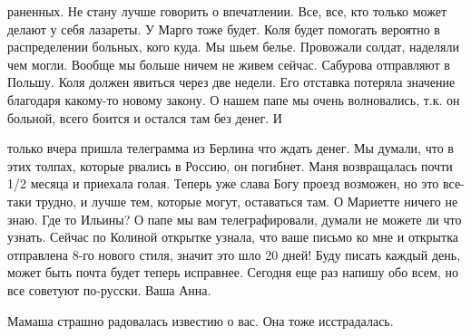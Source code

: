 
\noindent
раненных. Не стану лучше говорить о впечатлении. Все, все, кто только может
делают у себя лазареты. У Марго тоже будет. Коля будет помогать вероятно в
распределении больных, кого куда. Мы шьем белье. Провожали солдат, наделяли чем
могли. Вообще мы больше ничем не живем сейчас. Сабурова отправляют в Польшу.
Коля должен явиться через две недели. Его отставка потеряла значение благодаря
какому-то новому закону. О нашем папе мы очень волновались, т.к. он больной,
всего боится и остался там без денег. И


\noindent
только вчера пришла телеграмма из Берлина что ждать денег. Мы думали, что в
этих толпах, которые рвались в Россию, он погибнет. Маня возвращалась почти 1/2
месяца и приехала голая. Теперь уже слава Богу проезд возможен, но это все-таки
трудно, и лучше тем, которые могут, оставаться там. О Мариетте ничего не знаю.
Где то Ильины? О папе мы вам телеграфировали, думали не можете ли что узнать.
Сейчас по Колиной открытке узнала, что ваше письмо ко мне и открытка отправлена
8-го нового стиля, значит это шло 20 дней! Буду писать каждый день, может быть
почта будет теперь исправнее. Сегодня еще раз напишу обо всем, но все советуют
по-русски. Ваша Анна.

Мамаша страшно радовалась известию о вас. Она тоже исстрадалась.
